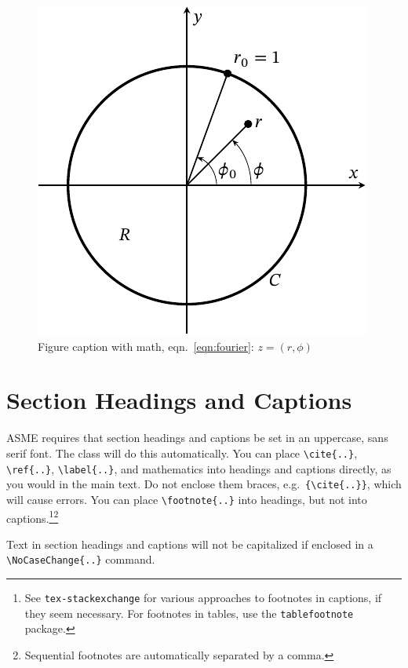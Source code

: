 \documentclass[varvw,largesc,upint,mathalfa=cal=euler,hyphenate,balance,lang-second=french,lang=english,colorlinks]{asmeconf} %
\begin{document}

\begin{figure}
\centering\includegraphics[width=0.7\linewidth]{sample-figure-1.pdf}
\caption{Figure caption with math, eqn.~\eqref{eqn:fourier}: $z = (r,\phi)$ \cite{Lienhard2019b}\label{fig:1}}
\end{figure}
 




\section{Section Headings and Captions}
ASME requires that section headings and captions be set in an uppercase, sans serif font.  The class will do this automatically.  You can place \verb|\cite{..}|, \verb|\ref{..}|, \verb|\label{..}|, and mathematics into headings and captions directly, as you would in the main text. Do not enclose them braces, e.g.\ \verb|{\cite{..}}|, which will cause errors. You can place \verb|\footnote{..}| into headings, but not into captions.\footnote{See \texttt{tex-stackexchange} for various approaches to footnotes in captions, if they seem necessary. For footnotes in tables, use the \texttt{tablefootnote} package.}\footnote{Sequential footnotes are automatically separated by a comma.}

Text in section headings and captions will not be capitalized if enclosed in a \verb|\NoCaseChange{..}| command.
\end{document}
